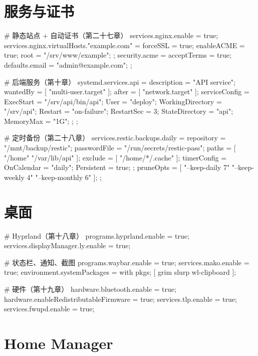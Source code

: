 \section{服务与证书}

\begin{nixcode}
{
  # 静态站点 + 自动证书（第二十七章）
  services.nginx.enable = true;
  services.nginx.virtualHosts."example.com" = {
    forceSSL = true;
    enableACME = true;
    root = "/srv/www/example";
  };
  security.acme = {
    acceptTerms = true;
    defaults.email = "admin@example.com";
  };

  # 后端服务（第十章）
  systemd.services.api = {
    description = "API service";
    wantedBy = [ "multi-user.target" ];
    after = [ "network.target" ];
    serviceConfig = {
      ExecStart = "/srv/api/bin/api";
      User = "deploy";
      WorkingDirectory = "/srv/api";
      Restart = "on-failure";
      RestartSec = 3;
      StateDirectory = "api";
      MemoryMax = "1G";
    };
  };

  # 定时备份（第二十八章）
  services.restic.backups.daily = {
    repository = "/mnt/backup/restic";
    passwordFile = "/run/secrets/restic-pass";
    paths = [
      "/home"
      "/var/lib/api"
    ];
    exclude = [ "/home/*/.cache" ];
    timerConfig = {
      OnCalendar = "daily";
      Persistent = true;
    };
    pruneOpts = [
      "--keep-daily 7"
      "--keep-weekly 4"
      "--keep-monthly 6"
    ];
  };
}
\end{nixcode}

\section{桌面}

\begin{nixcode}
{
  # Hyprland（第十八章）
  programs.hyprland.enable = true;
  services.displayManager.ly.enable = true;

  # 状态栏、通知、截图
  programs.waybar.enable = true;
  services.mako.enable = true;
  environment.systemPackages = with pkgs; [
    grim
    slurp
    wl-clipboard
  ];

  # 硬件（第十九章）
  hardware.bluetooth.enable = true;
  hardware.enableRedistributableFirmware = true;
  services.tlp.enable = true;
  services.fwupd.enable = true;
}
\end{nixcode}

\section{Home Manager}

